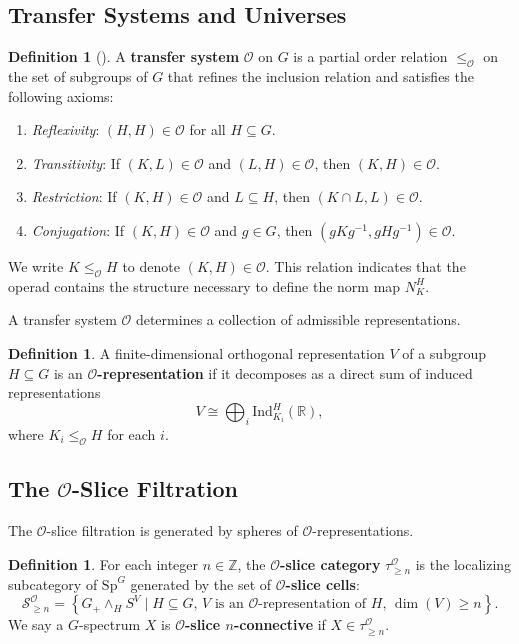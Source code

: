 \documentclass[11pt]{article}
\theoremstyle{plain}
\theoremstyle{definition}
\newtheorem{definition}[theorem]{Definition}
\newcommand{\Ocal}{\mathcal{O}}
\newcommand{\SpG}{\mathrm{Sp}^G}
\newcommand{\Ind}{\mathrm{Ind}}
\newcommand{\Z}{\mathbb{Z}}
\begin{document}
\subsection{Transfer Systems and Universes}

\begin{definition}[\cite{BH15}]
    A \textbf{transfer system} $\Ocal$ on $G$ is a partial order relation $\le_{\Ocal}$ on the set of subgroups of $G$ that refines the inclusion relation and satisfies the following axioms:
    \begin{enumerate}
        \item \emph{Reflexivity}: $(H, H) \in \Ocal$ for all $H \subseteq G$.
        \item \emph{Transitivity}: If $(K, L) \in \Ocal$ and $(L, H) \in \Ocal$, then $(K, H) \in \Ocal$.
        \item \emph{Restriction}: If $(K, H) \in \Ocal$ and $L \subseteq H$, then $(K \cap L, L) \in \Ocal$.
        \item \emph{Conjugation}: If $(K, H) \in \Ocal$ and $g \in G$, then $(gKg^{-1}, gHg^{-1}) \in \Ocal$.
    \end{enumerate}
    We write $K \le_{\Ocal} H$ to denote $(K, H) \in \Ocal$. This relation indicates that the operad contains the structure necessary to define the norm map $N_K^H$.
\end{definition}

A transfer system $\Ocal$ determines a collection of admissible representations.

\begin{definition}
    A finite-dimensional orthogonal representation $V$ of a subgroup $H \subseteq G$ is an \textbf{$\Ocal$-representation} if it decomposes as a direct sum of induced representations
    \[ V \cong \bigoplus_{i} \Ind_{K_i}^H(\mathbb{R}), \]
    where $K_i \le_{\Ocal} H$ for each $i$.
\end{definition}

\subsection{The $\Ocal$-Slice Filtration}

The $\Ocal$-slice filtration is generated by spheres of $\Ocal$-representations.

\begin{definition}
    For each integer $n \in \Z$, the \textbf{$\Ocal$-slice category} $\tau_{\ge n}^\Ocal$ is the localizing subcategory of $\SpG$ generated by the set of \textbf{$\Ocal$-slice cells}:
    \[
    \mathcal{S}_{\ge n}^\Ocal = \left\{ G_+ \wedge_H S^V \mid H \subseteq G, \, V \text{ is an } \Ocal\text{-representation of } H, \, \dim(V) \ge n \right\}.
    \]
    We say a $G$-spectrum $X$ is \textbf{$\Ocal$-slice $n$-connective} if $X \in \tau_{\ge n}^\Ocal$.
\end{definition}
\end{document}
